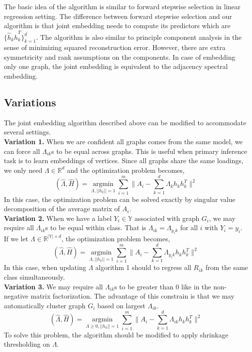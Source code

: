 \documentclass[10pt,journal,compsoc]{IEEEtran}
\begin{document}
\noindent The basic idea of the algorithm is similar to forward stepwise selection in linear regression setting. The difference between forward stepwise selection and our algorithm is that joint embedding needs to compute its predictors which are $\{\hat{h}_k \hat{h}_k^T\}_{k=1}^{d}$. The algorithm is also similar to principle component analysis in the sense of minimizing squared reconstruction error. However, there are extra symmetricity and rank assumptions on the components. In case of embedding only one graph, the joint embedding is equivalent to the adjacency spectral embedding. 

\subsection{Variations}
The joint embedding algorithm described above can be modified to accommodate several settings. \\
\textbf{Variation 1.} When we are confident all graphs comes from the same model, we can force all $\Lambda_{ik}$s to be equal across graphs. This is useful when primary inference task is to learn embeddings of vertices. Since all graphs share the same loadings, we only need $\Lambda \in \mathbb{R}^d$ and the optimization problem becomes,
\[ (\hat{\Lambda},\hat{H}) = \underset{\Lambda,||h_k||=1}{\operatorname{argmin}} \sum\limits_{i=1}^{m} \| A_i- \sum\limits_{k=1}^{d} \Lambda_{k} h_k h_k^T \|  ^2  \] 
In this case, the optimization problem can be solved exactly by singular value decomposition of the average matrix of $A_i$. \\
\textbf{Variation 2.} When we have a label $Y_i \in \mathbb{Y}$ associated with graph $G_i$, we may require all $\Lambda_{ik}$s to be equal within class. That is $\Lambda_{ik}=\Lambda_{y_ik}$ for all $i$ with $Y_i=y_i$. If we let $\Lambda \in \mathbb{R}^{|\mathbb{Y}| \times d}$, the optimization problem becomes,
\[ (\hat{\Lambda},\hat{H}) = \underset{\Lambda,||h_k||=1}{\operatorname{argmin}} \sum\limits_{i=1}^{m} \| A_i- \sum\limits_{k=1}^{d} \Lambda_{y_i k} h_k h_k^T \|  ^2  \] 
In this case, when updating $\Lambda$ algorithm 1 should to regress all $R_{ik}$ from the same class simultaneously. \\
\textbf{Variation 3.} We may require all $\Lambda_{ik}$s to be greater than $0$ like in the non-negative matrix factorization. The advantage of this constrain is that we may automatically cluster graph $G_i$ based on largest $\Lambda_{ik}$. 
\[ (\hat{\Lambda},\hat{H}) = \underset{\Lambda \geq 0,||h_k||=1}{\operatorname{argmin}} \sum\limits_{i=1}^{m} \| A_i- \sum\limits_{k=1}^{d} \Lambda_{ik} h_k h_k^T \|  ^2  \] 
To solve this problem, the algorithm should be modified to apply shrinkage thresholding on $\Lambda$. \\
\end{document}
